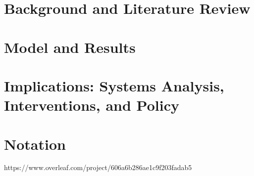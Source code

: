 
% 



\part{Background and Literature Review} \label{part-background}







\part{Model and Results} \label{part-model}



\part{Implications: Systems Analysis, Interventions, and Policy} \label{part-system}




\part{Notation}
https://www.overleaf.com/project/606a6b286ae1c9f203fadab5